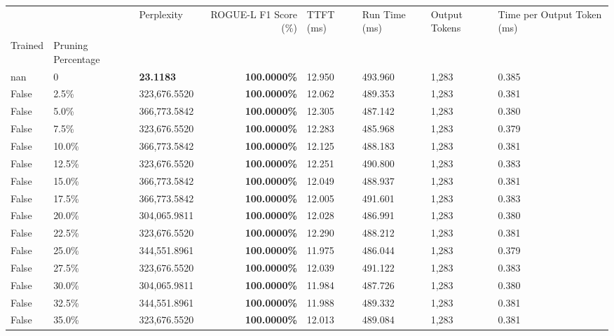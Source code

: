 \begin{table}[H]
\label{tab:evaluation-pipeline-13-untrained}
\begin{tabular}{lllrllll}
\toprule
 &  & Perplexity & ROGUE-L F1 Score (\%) & TTFT (ms) & Run Time (ms) & Output Tokens & Time per Output Token (ms) \\
Trained & Pruning Percentage &  &  &  &  &  &  \\
\midrule
nan & 0 & \bfseries 23.1183 & \bfseries 100.0000\% & 12.950 & 493.960 & 1,283 & 0.385 \\
\cline{1-8}
False & 2.5\% & 323,676.5520 & \bfseries \color{red} 100.0000\% & 12.062 & 489.353 & 1,283 & 0.381 \\
\cline{1-8}
False & 5.0\% & 366,773.5842 & \bfseries \color{red} 100.0000\% & 12.305 & 487.142 & 1,283 & 0.380 \\
\cline{1-8}
False & 7.5\% & 323,676.5520 & \bfseries \color{red} 100.0000\% & 12.283 & 485.968 & 1,283 & 0.379 \\
\cline{1-8}
False & 10.0\% & 366,773.5842 & \bfseries \color{red} 100.0000\% & 12.125 & 488.183 & 1,283 & 0.381 \\
\cline{1-8}
False & 12.5\% & 323,676.5520 & \bfseries \color{red} 100.0000\% & 12.251 & 490.800 & 1,283 & 0.383 \\
\cline{1-8}
False & 15.0\% & 366,773.5842 & \bfseries \color{red} 100.0000\% & 12.049 & 488.937 & 1,283 & 0.381 \\
\cline{1-8}
False & 17.5\% & 366,773.5842 & \bfseries \color{red} 100.0000\% & 12.005 & 491.601 & 1,283 & 0.383 \\
\cline{1-8}
False & 20.0\% & \color{red} 304,065.9811 & \bfseries \color{red} 100.0000\% & 12.028 & 486.991 & 1,283 & 0.380 \\
\cline{1-8}
False & 22.5\% & 323,676.5520 & \bfseries \color{red} 100.0000\% & 12.290 & 488.212 & 1,283 & 0.381 \\
\cline{1-8}
False & 25.0\% & 344,551.8961 & \bfseries \color{red} 100.0000\% & 11.975 & 486.044 & 1,283 & 0.379 \\
\cline{1-8}
False & 27.5\% & 323,676.5520 & \bfseries \color{red} 100.0000\% & 12.039 & 491.122 & 1,283 & 0.383 \\
\cline{1-8}
False & 30.0\% & \color{red} 304,065.9811 & \bfseries \color{red} 100.0000\% & 11.984 & 487.726 & 1,283 & 0.380 \\
\cline{1-8}
False & 32.5\% & 344,551.8961 & \bfseries \color{red} 100.0000\% & 11.988 & 489.332 & 1,283 & 0.381 \\
\cline{1-8}
False & 35.0\% & 323,676.5520 & \bfseries \color{red} 100.0000\% & 12.013 & 489.084 & 1,283 & 0.381 \\

\end{tabular}
\end{table}
